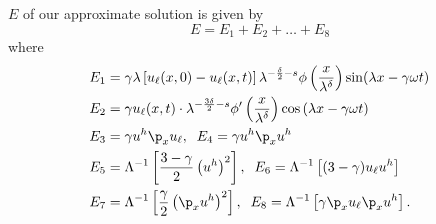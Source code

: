 				 $E$ of our approximate solution is given by
				 \begin{equation*}
					 E=E_1 + E_2 + \dots + E_8
				 \end{equation*}
				 where
				 \begin{equation}
					 \label{all_errors_together}
					 \begin{split}
						  E_1 & = \gamma \lambda \left[ u_\ell(x,0) - u_\ell(x,t)
						 \right] \lambda^{-\frac{\delta}{2}-s} \phi\left(
						 \frac{x}{\lambda^ \delta}
						 \right)\sin(\lambda x - \gamma \omega t)
						 \\
						 E_2 & = \gamma u_\ell(x,t) \cdot \lambda^{-\frac{3\delta}{2}-s}
						 \phi'\left( \frac{x}{\lambda^\delta} \right)\cos\left( \lambda
						 x - \gamma \omega t
						 \right)
						 \\
						 E_3 & = \gamma u^h \p_x u_\ell, \; \; E_4 = \gamma u^h \p_x u^h
						 \\
						 E_5 & = \Lambda^{-1}\left[ \frac{3-\gamma}{2} \left(
						 u^h \right)^2 
						 \right], \; \; E_6 = \Lambda^{-1}
						 \left[ (3- \gamma)u_\ell u^h \right]
						 \\
						 E_7 & = \Lambda^{-1} \left[ \frac{\gamma}{2} \left(
						 \p_x u^h \right)^2 \right ], \; \;
						 E_8 = \Lambda^{-1} \left[ \gamma \p_x u_\ell \p_x u^h \right]
						 .
						 \end{split}
				 \end{equation}
